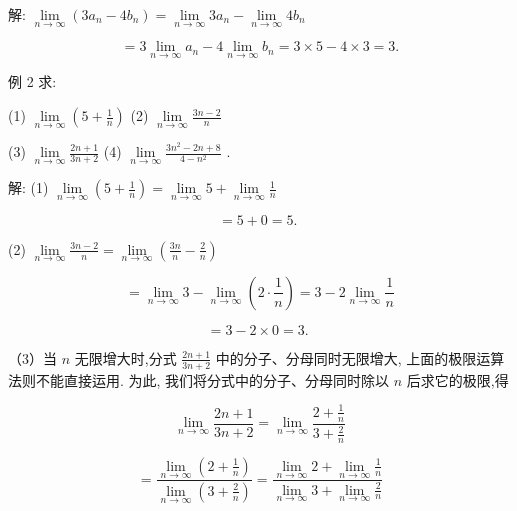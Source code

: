 \documentclass[lang=cn,newtx,10pt,scheme=chinese]{elegantbook}
\begin{document}
解: \(\mathop{\lim }\limits_{{n \rightarrow \infty }}\left( {3{a}_{n} - 4{b}_{n}}\right) = \mathop{\lim }\limits_{{n \rightarrow \infty }}3{a}_{n} - \mathop{\lim }\limits_{{n \rightarrow \infty }}4{b}_{n}\)

\[
= 3\mathop{\lim }\limits_{{n \rightarrow \infty }}{a}_{n} - 4\mathop{\lim }\limits_{{n \rightarrow \infty }}{b}_{n} = 3 \times 5 - 4 \times 3 = 3\text{.}
\]

例 2 求:

(1) \(\mathop{\lim }\limits_{{n \rightarrow \infty }}\left( {5 + \frac{1}{n}}\right)\) (2) \(\mathop{\lim }\limits_{{n \rightarrow \infty }}\frac{{3n} - 2}{n}\)

(3) \(\mathop{\lim }\limits_{{n \rightarrow \infty }}\frac{{2n} + 1}{{3n} + 2}\) (4) \(\mathop{\lim }\limits_{{n \rightarrow \infty }}\frac{3{n}^{2} - {2n} + 8}{4 - {n}^{2}}\) .

解: (1) \(\mathop{\lim }\limits_{{n \rightarrow \infty }}\left( {5 + \frac{1}{n}}\right) = \mathop{\lim }\limits_{{n \rightarrow \infty }}5 + \mathop{\lim }\limits_{{n \rightarrow \infty }}\frac{1}{n}\)

\[
= 5 + 0 = 5\text{. }
\]

(2) \(\mathop{\lim }\limits_{{n \rightarrow \infty }}\frac{{3n} - 2}{n} = \mathop{\lim }\limits_{{n \rightarrow \infty }}\left( {\frac{3n}{n} - \frac{2}{n}}\right)\)

\[
= \mathop{\lim }\limits_{{n \rightarrow \infty }}3 - \mathop{\lim }\limits_{{n \rightarrow \infty }}\left( {2 \cdot \frac{1}{n}}\right) = 3 - 2\mathop{\lim }\limits_{{n \rightarrow \infty }}\frac{1}{n}
\]

\[
= 3 - 2 \times 0 = 3\text{. }
\]

（3）当 \(n\) 无限增大时,分式 \(\frac{{2n} + 1}{{3n} + 2}\) 中的分子、分母同时无限增大, 上面的极限运算法则不能直接运用. 为此, 我们将分式中的分子、分母同时除以 \(n\) 后求它的极限,得

\[
\mathop{\lim }\limits_{{n \rightarrow \infty }}\frac{{2n} + 1}{{3n} + 2} = \mathop{\lim }\limits_{{n \rightarrow \infty }}\frac{2 + \frac{1}{n}}{3 + \frac{2}{n}}
\]

\[
= \frac{\mathop{\lim }\limits_{{n \rightarrow \infty }}\left( {2 + \frac{1}{n}}\right) }{\mathop{\lim }\limits_{{n \rightarrow \infty }}\left( {3 + \frac{2}{n}}\right) } = \frac{\mathop{\lim }\limits_{{n \rightarrow \infty }}2 + \mathop{\lim }\limits_{{n \rightarrow \infty }}\frac{1}{n}}{\mathop{\lim }\limits_{{n \rightarrow \infty }}3 + \mathop{\lim }\limits_{{n \rightarrow \infty }}\frac{2}{n}}
\]
\end{document}
